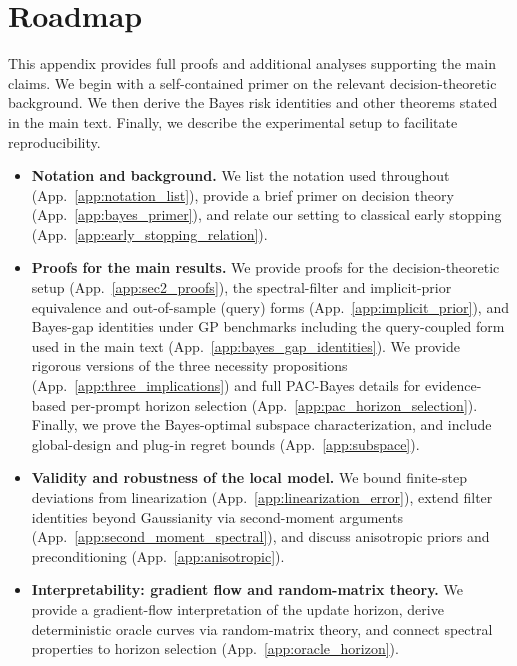 \documentclass{article}
\theoremstyle{plain}
\theoremstyle{definition}
\theoremstyle{remark}
\begin{document}
\section{Roadmap}

This appendix provides full proofs and additional analyses supporting the main claims. We begin with a self-contained primer on the relevant decision-theoretic background. We then derive the Bayes risk identities and other theorems stated in the main text. Finally, we describe the experimental setup to facilitate reproducibility.

\begin{itemize}[leftmargin=*, itemsep=1pt, parsep=0pt, topsep=2pt]

\item \textbf{Notation and background.}
We list the notation used throughout (App.~\ref{app:notation_list}), provide a brief primer on decision theory (App.~\ref{app:bayes_primer}),
and relate our setting to classical early stopping (App.~\ref{app:early_stopping_relation}).

\item \textbf{Proofs for the main results.}
We provide proofs for the decision-theoretic setup (App.~\ref{app:sec2_proofs}), the spectral-filter and implicit-prior equivalence and out-of-sample (query) forms (App.~\ref{app:implicit_prior}), and Bayes-gap identities under GP benchmarks
including the query-coupled form used in the main text (App.~\ref{app:bayes_gap_identities}). We provide rigorous versions of the three necessity propositions (App.~\ref{app:three_implications}) and full PAC-Bayes details for evidence-based per-prompt horizon selection (App.~\ref{app:pac_horizon_selection}). Finally, we prove the Bayes-optimal subspace characterization, and include global-design and plug-in regret bounds
(App.~\ref{app:subspace}).

\item \textbf{Validity and robustness of the local model.}
We bound finite-step deviations from linearization (App.~\ref{app:linearization_error}), extend filter identities beyond
Gaussianity via second-moment arguments (App.~\ref{app:second_moment_spectral}), and discuss anisotropic priors and
preconditioning (App.~\ref{app:anisotropic}).

\item \textbf{Interpretability: gradient flow and random-matrix theory.}
We provide a gradient-flow interpretation of the update horizon, derive deterministic oracle curves via random-matrix theory, and connect spectral properties to horizon selection (App.~\ref{app:oracle_horizon}).


\end{itemize}
\end{document}
